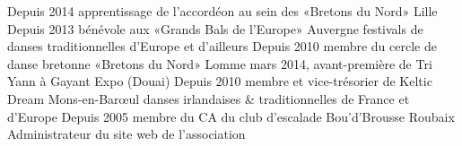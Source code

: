 \documentclass[print]{cv} %
\begin{document}
\begin{entrylist}
\entry
{Depuis 2014}
{{\normalfont apprentissage de l'accordéon au sein des «Bretons du Nord»}}
{Lille}
{}
\entry
{Depuis 2013}
{{\normalfont bénévole aux «Grands Bals de l'Europe»}}
{Auvergne}
{festivals de danses traditionnelles d'Europe et d'ailleurs}
\entry
{Depuis 2010}
{{\normalfont membre du cercle de danse bretonne «Bretons du Nord»}}
{Lomme}
{mars 2014, avant-première de Tri Yann à Gayant Expo (Douai)}
\entry
{Depuis 2010}
{{\normalfont membre et vice-trésorier de Keltic Dream}}
{Mons-en-Barœul}
{danses irlandaises \& traditionnelles de France et d'Europe}
\entry
{Depuis 2005}
{{\normalfont membre du CA du club d'escalade Bou'd'Brousse}}
{Roubaix}
{Administrateur du site web de l'association}
\end{entrylist}
\end{document}
